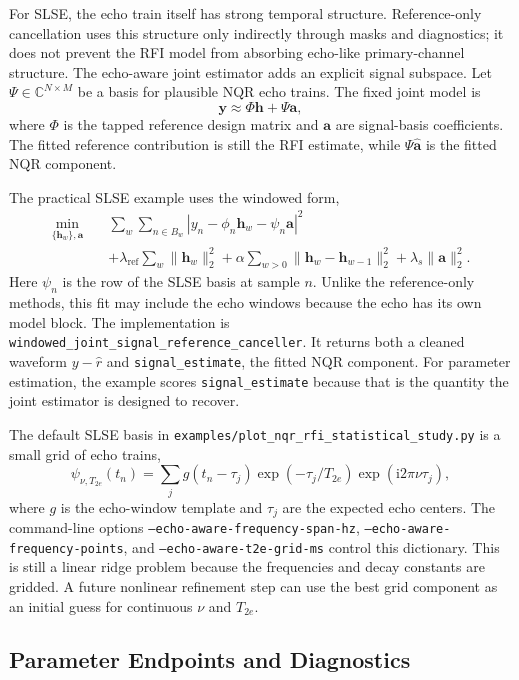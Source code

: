 \documentclass[11pt,oneside]{report}
\newcommand{\code}[1]{\texttt{#1}}
\newcommand{\ii}{\mathrm{i}}
\begin{document}
For SLSE, the echo train itself has strong temporal structure. Reference-only
cancellation uses this structure only indirectly through masks and diagnostics;
it does not prevent the RFI model from absorbing echo-like primary-channel
structure. The echo-aware joint estimator adds an explicit signal subspace.
Let \(\Psi\in\mathbb{C}^{N\times M}\) be a basis for plausible NQR echo trains.
The fixed joint model is
\[
  \mathbf{y} \approx \Phi\mathbf{h}+\Psi\mathbf{a},
\]
where \(\Phi\) is the tapped reference design matrix and \(\mathbf{a}\) are
signal-basis coefficients. The fitted reference contribution is still the RFI
estimate, while \(\Psi\widehat{\mathbf{a}}\) is the fitted NQR component.

The practical SLSE example uses the windowed form,
\[
\begin{split}
  \min_{\{\mathbf{h}_w\},\mathbf{a}}\quad
  &\sum_w\sum_{n\in B_w}
    \left|y_n-\phi_n\mathbf{h}_w-\psi_n\mathbf{a}\right|^2 \\
  &+ \lambda_{\mathrm{ref}}\sum_w\|\mathbf{h}_w\|_2^2
   + \alpha\sum_{w>0}\|\mathbf{h}_w-\mathbf{h}_{w-1}\|_2^2
   + \lambda_s\|\mathbf{a}\|_2^2.
\end{split}
\]
Here \(\psi_n\) is the row of the SLSE basis at sample \(n\). Unlike the
reference-only methods, this fit may include the echo windows because the echo
has its own model block. The implementation is
\code{windowed\_joint\_signal\_\allowbreak reference\_canceller}. It returns
both a cleaned waveform \(y-\widehat{r}\) and \code{signal\_estimate}, the
fitted NQR component. For parameter estimation, the example scores
\code{signal\_estimate} because that is the quantity the joint estimator is
designed to recover.

The default SLSE basis in
\code{examples/plot\_nqr\_rfi\_statistical\_study.py} is a small grid of echo
trains,
\[
  \psi_{\nu,T_{2e}}(t_n)
  =
  \sum_j
  g(t_n-\tau_j)
  \exp(-\tau_j/T_{2e})
  \exp(\ii 2\pi\nu\tau_j),
\]
where \(g\) is the echo-window template and \(\tau_j\) are the expected echo
centers. The command-line options
\code{--echo-aware-frequency-span-hz},
\code{--echo-aware-frequency-points}, and
\code{--echo-aware-t2e-grid-ms} control this dictionary. This is still a linear
ridge problem because the frequencies and decay constants are gridded. A future
nonlinear refinement step can use the best grid component as an initial guess
for continuous \(\nu\) and \(T_{2e}\).

\subsection{Parameter Endpoints and Diagnostics}
\end{document}
